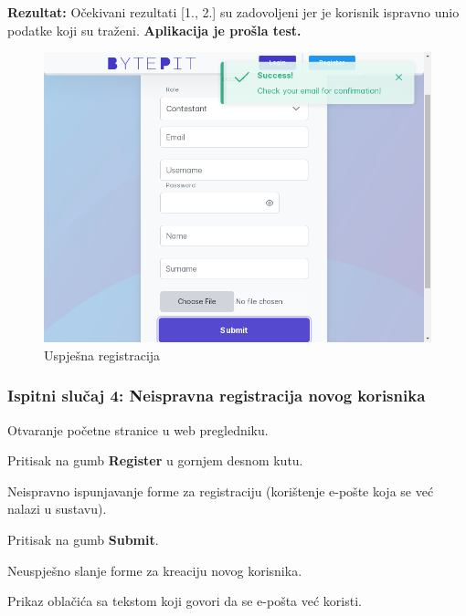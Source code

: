 			\noindent \textbf{Rezultat:} Očekivani rezultati [1., 2.] su zadovoljeni jer je korisnik ispravno unio podatke koji su traženi. \textbf{Aplikacija je prošla test.}
			
			\begin{figure}[H]
				\includegraphics[scale=0.50]{slike/registration_new_user_test_result.PNG}
				\centering
				\caption{Uspješna registracija}
				\label{fig:sucess_register}
			\end{figure}
			
			\eject
			
			\subsubsection{Ispitni slučaj 4: Neispravna registracija novog korisnika}
			
			
			\begin{packed_enum}
				
				\item  Otvaranje početne stranice u web pregledniku.
				\item  Pritisak na gumb \textbf{Register} u gornjem desnom kutu.
				\item  Neispravno ispunjavanje forme za registraciju (korištenje e-pošte koja se već nalazi u sustavu).
				\item  Pritisak na gumb \textbf{Submit}. 
				
			\end{packed_enum}
			
			\begin{packed_enum}
				
				\item  Neuspješno slanje forme za kreaciju novog korisnika.
				\item  Prikaz oblačića sa tekstom koji govori da se e-pošta već koristi.
				
			\end{packed_enum}
			

